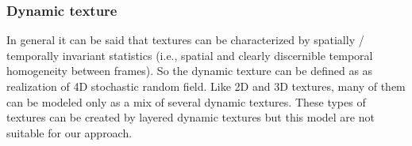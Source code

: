 		\subsubsection{Dynamic texture}
		
		
In general it can be said that textures can be characterized by spatially / temporally invariant statistics \cite{Zhu98filters} (i.e.,  spatial  and clearly discernible  temporal homogeneity between frames). So the dynamic texture can be defined as as  realization of 4D stochastic random field. Like 2D and 3D textures, many of them can be modeled only as a mix of several dynamic textures\cite{Chan_modeling,ChanV05:0}. These types of textures can be created by layered dynamic textures \cite{Chan06layereddynamic} but this model are not suitable for our approach.  %

